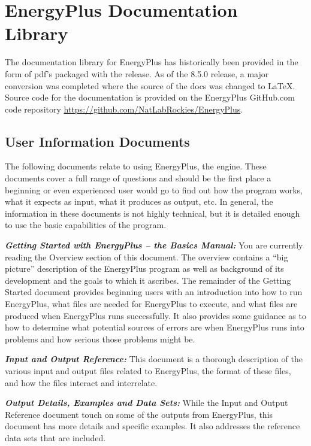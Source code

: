 \section{EnergyPlus Documentation Library}\label{energyplus-documentation-library}

The documentation library for EnergyPlus has historically been provided in the form of pdf's packaged with the release. As of the 8.5.0 release, a major conversion was completed where the source of the docs was changed to \LaTeX. Source code for the documentation is provided on the EnergyPlus GitHub.com code repository \url{https://github.com/NatLabRockies/EnergyPlus}.

\subsection{User Information Documents}\label{user-information-documents}

The following documents relate to using EnergyPlus, the engine. These documents cover a full range of questions and should be the first place a beginning or even experienced user would go to find out how the program works, what it expects as input, what it produces as output, etc. In general, the information in these documents is not highly technical, but it is detailed enough to use the basic capabilities of the program.

\textbf{\emph{Getting Started with EnergyPlus -- the Basics Manual:}} You are currently reading the Overview section of this document. The overview contains a ``big picture'' description of the EnergyPlus program as well as background of its development and the goals to which it ascribes. The remainder of the Getting Started document provides beginning users with an introduction into how to run EnergyPlus, what files are needed for EnergyPlus to execute, and what files are produced when EnergyPlus runs successfully. It also provides some guidance as to how to determine what potential sources of errors are when EnergyPlus runs into problems and how serious those problems might be.

\textbf{\emph{Input and Output Reference:}} This document is a thorough description of the various input and output files related to EnergyPlus, the format of these files, and how the files interact and interrelate.

\textbf{\emph{Output Details, Examples and Data Sets:}} While the Input and Output Reference document touch on some of the outputs from EnergyPlus, this document has more details and specific examples. It also addresses the reference data sets that are included.

